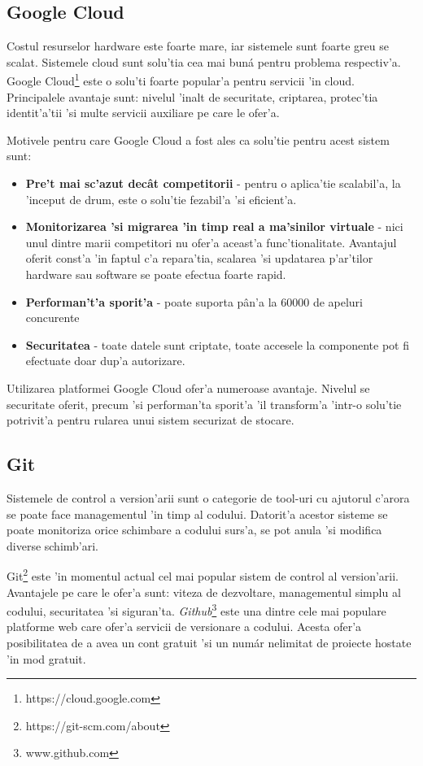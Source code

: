 \documentclass[12pt,a4paper,twoside]{report}
\begin{document}
\subsection{Google Cloud}
Costul resurselor hardware este foarte mare, iar sistemele sunt foarte greu se scalat. Sistemele cloud sunt solu'tia cea mai buná pentru problema respectiv'a. Google Cloud\footnote{https://cloud.google.com} este o solu'ti foarte popular'a pentru servicii 'in cloud. Principalele avantaje sunt: nivelul 'inalt de securitate, criptarea, protec'tia identit'a'tii 'si multe servicii auxiliare pe care le ofer'a.

Motivele pentru care Google Cloud a fost ales ca solu'tie pentru acest sistem sunt:
\begin{itemize}
\item{\textbf{Pre't mai sc'azut decât competitorii} - pentru o aplica'tie scalabil'a, la 'inceput de drum, este o solu'tie fezabil'a 'si eficient'a.}
\item{\textbf{Monitorizarea 'si migrarea 'in timp real a ma'sinilor virtuale} - nici unul dintre marii competitori nu ofer'a aceast'a func'tionalitate. Avantajul oferit const'a 'in faptul c'a repara'tia, scalarea 'si updatarea p'ar'tilor hardware sau software se poate efectua foarte rapid.} 
\item{\textbf{Performan't'a sporit'a} - poate suporta pân'a la 60000 de apeluri concurente}
\item{\textbf{Securitatea} - toate datele sunt criptate, toate accesele la componente pot fi efectuate doar dup'a autorizare.}
\end{itemize}
Utilizarea platformei Google Cloud ofer'a numeroase avantaje. Nivelul se securitate oferit, precum 'si performan'ta sporit'a 'il transform'a 'intr-o solu'tie potrivit'a pentru rularea unui sistem securizat de stocare.
\subsection{Git}
Sistemele de control a version'arii sunt o categorie de tool-uri cu ajutorul c'arora se poate face managementul 'in timp al codului. Datorit'a acestor sisteme se poate monitoriza orice schimbare a codului surs'a, se pot anula 'si modifica diverse schimb'ari.

Git\footnote{https://git-scm.com/about} este 'in momentul actual cel mai popular sistem de control al version'arii. Avantajele pe care le ofer'a sunt: viteza de dezvoltare, managementul simplu al codului, securitatea 'si siguran'ta. \textit{Github}\footnote{www.github.com} este una dintre cele mai populare platforme web care ofer'a servicii de versionare a codului. Acesta ofer'a posibilitatea de a avea un cont gratuit 'si un numár nelimitat de proiecte hostate 'in mod gratuit.
\end{document}
